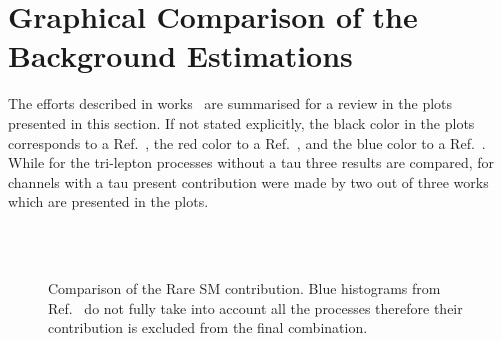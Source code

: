 \newpage
\appendix
\section{Graphical Comparison of the Background Estimations}
\label{app:graphical}
The efforts described in works~\cite{AN2012:248,AN2012:255,AN2012:256} are summarised for 
a review in the plots presented in this section. If not stated explicitly, the black color in the plots corresponds to 
a Ref.~\cite{AN2012:248}, the red color to a Ref.~\cite{AN2012:255}, and the blue color to a Ref.~\cite{AN2012:256}.
While for the tri-lepton processes without a tau three results are compared, for channels with a tau present
contribution were made by two out of three works which are presented in the plots.
\begin{figure}[htp]
\begin{center}
 \\
 \\
\caption{Comparison of the Rare SM contribution.  Blue histograms from Ref.~\cite{AN2012:256} do not fully take into account 
all the processes therefore their contribution is excluded from the final combination.}
\label{fig:rare1}
\end{center}
\end{figure}
